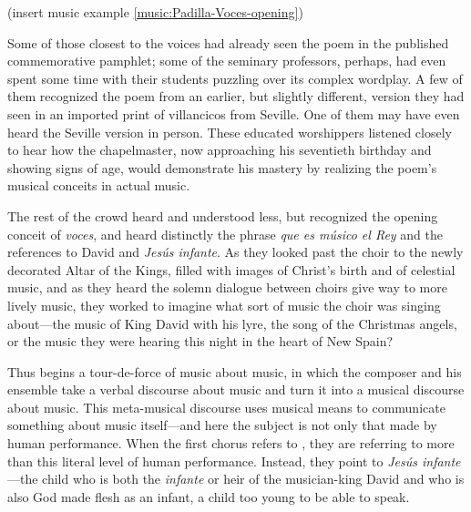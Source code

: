 (insert music example \ref{music:Padilla-Voces-opening})
\label{music:Padilla-Voces-opening}

Some of those closest to the voices had already seen the poem in the published
commemorative pamphlet; some of the seminary professors, perhaps, had even spent
some time with their students puzzling over its complex wordplay.
A few of them recognized the poem from an earlier, but slightly different,
version they had seen in an imported print of villancicos from Seville.
One of them may have even heard the Seville version in person.
These educated worshippers listened closely to hear how the chapelmaster, now
approaching his seventieth birthday and showing signs of age, would demonstrate
his mastery by realizing the poem's musical conceits in actual music.

The rest of the crowd heard and understood less, but recognized the opening
conceit of \emph{voces}, and heard distinctly the phrase \emph{que es músico el
Rey} and the references to David and \emph{Jesús infante}.
As they looked past the choir to the newly decorated Altar of the Kings, filled
with images of Christ's birth and of celestial music, and as they heard the
solemn dialogue between choirs give way to more lively music, they worked to
imagine what sort of music the choir was singing about---the music of King
David with his lyre, the song of the Christmas angels, or the music they were
hearing this night in the heart of New Spain?

Thus begins a tour-de-force of music about music, in which the composer and his
ensemble take a verbal discourse about music and turn it into a musical
discourse about music.
This meta-musical discourse uses musical means to communicate something about music
itself---and here the subject is not only that made by human performance.
When the first chorus refers to , they are referring to more than
this literal level of human performance.
Instead, they point to \emph{Jesús infante}---the child who is both the
\emph{infante} or heir of the musician-king David and who is also God made flesh
as an infant, a child too young to be able to speak.

